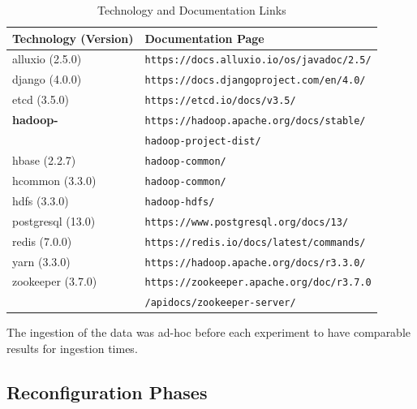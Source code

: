 \begin{table}[h]
    \centering
    \begin{tabular}{|l|l|}
        \hline
        \textbf{Technology (Version)} & \textbf{Documentation Page} \\
        \hline
        alluxio (2.5.0) & \texttt{https://docs.alluxio.io/os/javadoc/2.5/} \\
        django (4.0.0) & \texttt{https://docs.djangoproject.com/en/4.0/} \\
        etcd (3.5.0) & \texttt{https://etcd.io/docs/v3.5/} \\
        \textbf{hadoop-} & \texttt{https://hadoop.apache.org/docs/stable/}\\
        & \hspace{0.25cm} \texttt{hadoop-project-dist/} \\
        \hspace{0.15cm} hbase (2.2.7) & \hspace{0.5cm} \texttt{hadoop-common/} \\
        \hspace{0.15cm} hcommon (3.3.0) & \hspace{0.5cm} \texttt{hadoop-common/} \\
        \hspace{0.15cm} hdfs (3.3.0) & \hspace{0.5cm} \texttt{hadoop-hdfs/} \\
        postgresql (13.0) & \texttt{https://www.postgresql.org/docs/13/} \\
        redis (7.0.0) & \texttt{https://redis.io/docs/latest/commands/} \\
        yarn (3.3.0) & \texttt{https://hadoop.apache.org/docs/r3.3.0/} \\
        zookeeper (3.7.0) & \texttt{https://zookeeper.apache.org/doc/r3.7.0} \\
        & \hspace{0.25cm} \texttt{/apidocs/zookeeper-server/} \\
        \hline
    \end{tabular}
    \caption{Technology and Documentation Links}
    \label{tab:technology_documentation}
\end{table}

The ingestion of the data was ad-hoc before each experiment to have comparable results for ingestion times. 

\subsection{Reconfiguration Phases} \label{sec:exp_results} 

